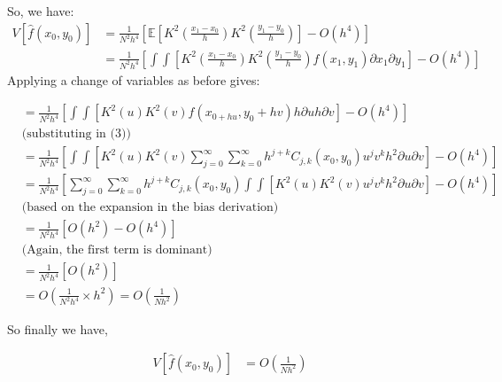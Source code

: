 \documentclass[11pt]{article}
\theoremstyle{definition}
\begin{document}
So, we have:
\begin{equation*}
\begin{split}
V\left[\hat{f}(x_{0}, y_{0})\right]&=\frac{1}{N^{2}h^{4}}\left[\mathbb{E}\left[K^{2}\left(\frac{x_{1}-x_{0}}{h}\right)K^{2}\left(\frac{y_{1}-y_{0}}{h}\right)\right]-O(h^{4})\right] \\
 &=\frac{1}{N^{2}h^{4}}\left[\int \int \left[K^{2}\left(\frac{x_{1}-x_{0}}{h}\right)K^{2}\left(\frac{y_{1}-y_{0}}{h}\right) f(x_{1},y_{1})\partial x_{1} \partial y_{1}\right]-O(h^{4}) \right]
\end{split}
\end{equation*}
\noindent
Applying a change of variables as before gives:

\begin{equation*}
\begin{split}
 &=\frac{1}{N^{2}h^{4}}\left[\int \int \left[K^{2}(u)K^{2}(v) f(x_{0+hu},y_{0}+hv)h\partial u h\partial v\right]-O(h^{4}) \right]\\
 & \text{(substituting in (3))} \\
 &= \frac{1}{N^{2}h^{4}}\left[\int \int \left[K^{2}(u)K^{2}(v) \sum_{j=0}^{\infty} \sum_{k=0}^{\infty} h^{j+k}C_{j,k}\left(x_{0},y_{0}\right)u^{j}v^{k}h^{2}\partial u \partial v\right]-O(h^{4}) \right]\\
 &= \frac{1}{N^{2}h^{4}}\left[  \sum_{j=0}^{\infty} \sum_{k=0}^{\infty} h^{j+k}C_{j,k}\left(x_{0},y_{0}\right) \int \int \left[K^{2}(u)K^{2}(v)u^{j}v^{k}h^{2}\partial u \partial v\right]-O(h^{4}) \right] \\
 & \text{(based on the expansion in the bias derivation)} \\
 &= \frac{1}{N^{2}h^{4}}\left[O(h^{2})-O(h^{4})\right] \\
 & \text{(Again, the first term is dominant)} \\
 &= \frac{1}{N^{2}h^{4}}\left[O(h^{2})\right] \\
 &=O\left(\frac{1}{N^{2}h^{4}}\times h^{2}\right) = O\left(\frac{1}{Nh^{2}}\right)
\end{split}
\end{equation*}

\noindent So finally we have,

\begin{equation}
\begin{split}
V\left[\hat{f}(x_{0}, y_{0})\right]&=O\left(\frac{1}{Nh^{2}}\right)
\end{split}
\end{equation}
\end{document}
